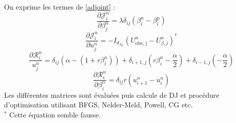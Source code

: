 \documentclass[a4paper,12pt]{article}
\newcommand{\bepar}[1]{
	\left( #1 \right)  
}
\newcommand\bk{\color{black}}
\newcommand\red{\color{red}}
\numberwithin{equation}{section} %
\begin{document}
\noindent  On exprime les termes de \eqref{adjoint} : 
\begin{equation}
\frac{\partial \mathcal{J}^n_i }{\partial \beta^n_j} = \lambda \delta_{ij} \bepar{\beta_i^n - \beta_i^{\text{p}}}
\end{equation}
\red
\begin{equation}
\frac{\partial \mathcal{J}^n_i}{\partial u_j^n} = -I_{d_{N_x}} \bepar{U^n_{\text{obs, j}} - U^n_{\beta, j}} ^*
\end{equation}
\bk
\begin{equation}
\frac{\partial \mathcal{R}^n_i }{u_j^n} = \delta_{ij}\bepar{\alpha -\bepar{1 + r \beta_i^n}} + \delta_{i+1, j} \bepar{r \beta^n_i - \frac{\alpha}{2}} + \delta_{i-1, j} \bepar{-\frac{\alpha}{2}} 
\end{equation}
\begin{equation}
\frac{\partial \mathcal{R}_i^n}{\partial \beta_i^n} = \delta_{ij} r \bepar{u^n_{i+1} - u^n_i}
\end{equation}
Les différentes matrices sont évaluées puis calcule de DJ et procédure d'optimisation utilisant BFGS, Nelder-Meld, Powell, CG etc.\\
\red $^*$ Cette équation semble fausse.
\bk
\pagebreak
\end{document}
